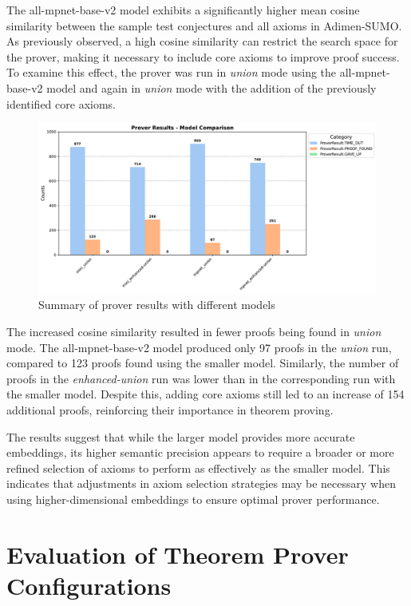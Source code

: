 \documentclass[english,version-2020-11]{uzl-thesis}
\begin{document}
The all-mpnet-base-v2 model exhibits a significantly higher mean cosine similarity between the sample test conjectures and all axioms in Adimen-SUMO. As previously observed, a high cosine similarity can restrict the search space for the prover, making it necessary to include core axioms to improve proof success. To examine this effect, the prover was run in \textit{union} mode using the all-mpnet-base-v2 model and again in \textit{union} mode with the addition of the previously identified core axioms.

\begin{figure}[h!]
    \centering
    \includegraphics[width=\textwidth]{different_mode_output.pdf}
    \caption{Summary of prover results with different models}
    \label{fig:results_different_models}
\end{figure}        
\FloatBarrier

The increased cosine similarity resulted in fewer proofs being found in \textit{union} mode. The all-mpnet-base-v2 model produced only 97 proofs in the \textit{union} run, compared to 123 proofs found using the smaller model. Similarly, the number of proofs in the \textit{enhanced-union} run was lower than in the corresponding run with the smaller model. Despite this, adding core axioms still led to an increase of 154 additional proofs, reinforcing their importance in theorem proving.

The results suggest that while the larger model provides more accurate embeddings, its higher semantic precision appears to require a broader or more refined selection of axioms to perform as effectively as the smaller model. This indicates that adjustments in axiom selection strategies may be necessary when using higher-dimensional embeddings to ensure optimal prover performance.


\section{Evaluation of Theorem Prover Configurations}
\end{document}
